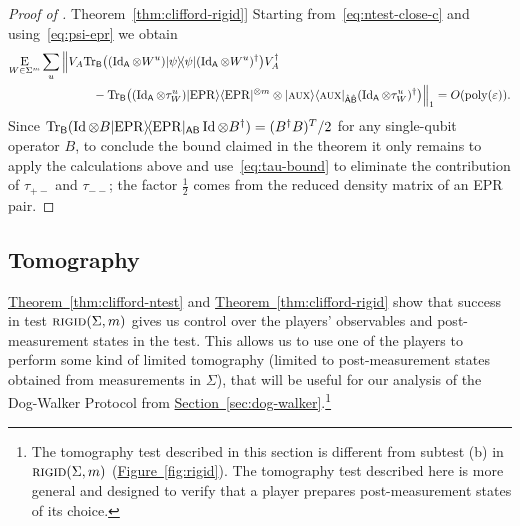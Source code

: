 \documentclass[11pt]{article}
\numberwithin{equation}{section}
\theoremstyle{definition}
\theoremstyle{plain}
\newcommand{\expref}[2]{\hyperref[#2]{#1~\ref{#2}}}
\newcommand{\ket}[1]{|#1\rangle}
\newcommand{\bra}[1]{\langle#1|}
\newcommand{\proj}[1]{\ket{#1}\!\bra{#1}}
\newcommand{\Tr}{\mbox{\rm Tr}}
\newcommand{\Id}{\ensuremath{\mathop{\rm Id}\nolimits}}
\newcommand{\Es}[1]{\ensuremath{\mathop{\textsc{E}}}_{#1}} %
\DeclareMathOperator{\poly}{poly}
\newcommand{\reg}[1]{{\textsf{#1}}}
\newcommand{\eps}{\varepsilon}
\newcommand{\EPR}{{\rm EPR}}
\newcommand{\aux}{\textsc {aux}}
\newcommand{\rigid}{\textsc{rigid}}
\begin{document}
\begin{proof}[Proof of \expref{Theorem}{thm:clifford-rigid}]
Starting from~\eqref{eq:ntest-close-c} and using~\eqref{eq:psi-epr} we obtain 
\begin{align*}\Es{W\in\Sigma^{m}}\sum_{u} \Big\|& V_A\Tr_\reg{B}\big( (\Id_\reg{A} \otimes W^{u})\proj{\psi}(\Id_\reg{A} \otimes W^{u})^\dagger \big) V_A^\dagger \\
&\qquad- \Tr_\reg{B}\big( (\Id_\reg{A} \otimes \tau_W^{u})\ket{\EPR}\bra{\EPR}^{\otimes m} \otimes \ket{\aux}\bra{\aux}_{\hat{\reg{A}}\hat{\reg{B}}}(\Id_\reg{A} \otimes \tau_W^{u})^\dagger \big) \Big\|_1 = O(\poly(\eps)).
\end{align*}
Since $\Tr_{\reg{B}}( \Id \otimes B \proj{\EPR}_{\reg{AB}} \Id\otimes B^\dagger) = (B^\dagger B)^T/2$ for any single-qubit operator $B$, to conclude the bound claimed in the theorem it only remains to apply the calculations above and use~\eqref{eq:tau-bound} to eliminate the contribution of $\tau_{+-}$ and $\tau_{--}$; the factor $\frac{1}{2}$ comes from the reduced density matrix of an EPR pair.
\end{proof}


\subsection{Tomography}
\label{subsec:tomography}
\label{sec: TOM test}

\expref{Theorem}{thm:clifford-ntest} and \expref{Theorem}{thm:clifford-rigid} show that success in test $\rigid(\Sigma,m)$ gives us control over the players' observables and post-measurement states in the test. This allows us to use one of the players to perform some kind of limited tomography (limited to post-measurement states obtained from measurements in $\Sigma$), that will be useful for our analysis of the Dog-Walker Protocol from \expref{Section}{sec:dog-walker}.\footnote{The tomography test described in this section is different from subtest (b) in $\rigid(\Sigma,m)$ (\expref{Figure}{fig:rigid}). The tomography test described here is more general and designed to verify that a player prepares post-measurement states of its choice.}
\end{document}
